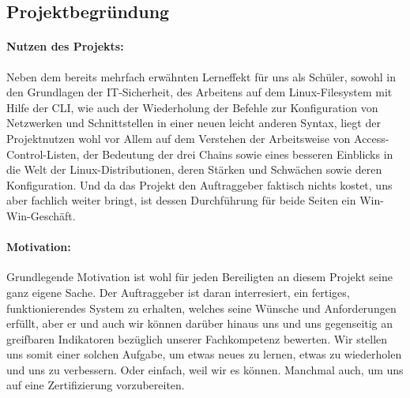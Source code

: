 \subsection{Projektbegründung} 
\label{sec:Projektbegruendung}
\paragraph*{Nutzen des Projekts: } Neben dem bereits mehrfach erwähnten Lerneffekt für uns als Schüler, sowohl in den Grundlagen der IT-Sicherheit, des Arbeitens auf dem Linux-Filesystem mit Hilfe der \ac{CLI}, wie auch der Wiederholung der Befehle zur Konfiguration von Netzwerken und Schnittstellen in einer neuen leicht anderen Syntax, liegt der Projektnutzen wohl vor Allem auf dem Verstehen der Arbeitsweise von Access-Control-Listen, der Bedeutung der drei Chains sowie eines besseren Einblicks in die Welt der Linux-Distributionen, deren Stärken und Schwächen sowie deren Konfiguration. Und da das Projekt den Auftraggeber faktisch nichts kostet, uns aber fachlich weiter bringt, ist dessen Durchführung für beide Seiten ein Win-Win-Geschäft.
    
\paragraph*{Motivation: } Grundlegende Motivation ist wohl für jeden Bereiligten an diesem Projekt seine ganz eigene Sache. Der Auftraggeber ist daran interresiert, ein fertiges, funktionierendes System zu erhalten, welches seine Wünsche und Anforderungen erfüllt, aber er und auch wir können darüber hinaus uns und uns gegenseitig an greifbaren Indikatoren bezüglich unserer  Fachkompetenz bewerten. Wir stellen uns somit einer solchen Aufgabe, um etwas neues zu lernen, etwas zu wiederholen und uns zu verbessern. Oder einfach, weil wir es können. Manchmal auch, um uns auf eine Zertifizierung vorzubereiten.


